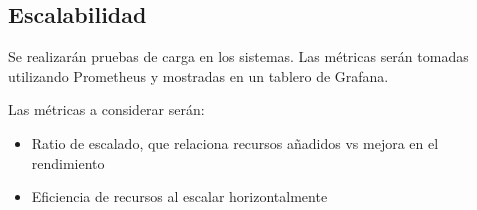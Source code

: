 \subsection{Escalabilidad}

Se realizarán pruebas de carga en los sistemas.
Las métricas serán tomadas utilizando Prometheus y mostradas en un tablero de Grafana.

Las métricas a considerar serán:
\begin{itemize}
    \item Ratio de escalado, que relaciona recursos añadidos vs mejora en el rendimiento
    \item Eficiencia de recursos al escalar horizontalmente
\end{itemize}